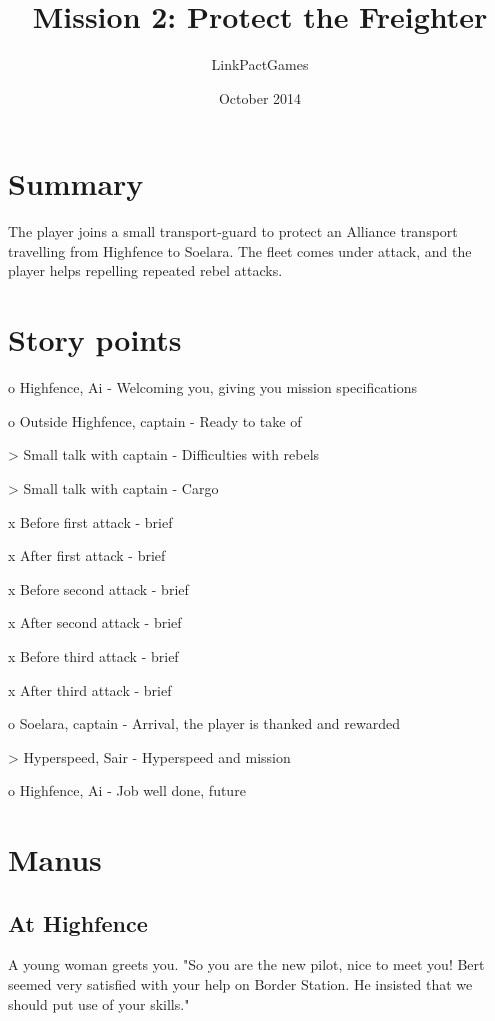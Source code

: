 \documentclass[a4paper,12pt]{article}
\begin{document}
\title{Mission 2: Protect the Freighter}
\author{LinkPactGames}
\date{October 2014}
\maketitle

\section{Summary}
The player joins a small transport-guard to protect an Alliance
transport travelling from Highfence to Soelara. The fleet comes under attack,
and the player helps repelling repeated rebel attacks.

\section{Story points}
o Highfence, Ai - Welcoming you, giving you mission specifications

o Outside Highfence, captain - Ready to take of

> Small talk with captain - Difficulties with rebels

> Small talk with captain - Cargo

x Before first attack - brief

x After first attack - brief

x Before second attack - brief

x After second attack - brief

x Before third attack - brief

x After third attack - brief

o Soelara, captain - Arrival, the player is thanked and rewarded

> Hyperspeed, Sair - Hyperspeed and mission

o Highfence, Ai - Job well done, future

\section{Manus}

\subsection{At Highfence}

A young woman greets you. "So you are the new pilot, nice to meet you!
Bert seemed very satisfied with your help on Border Station. He insisted
that we should put use of your skills."
\end{document}
